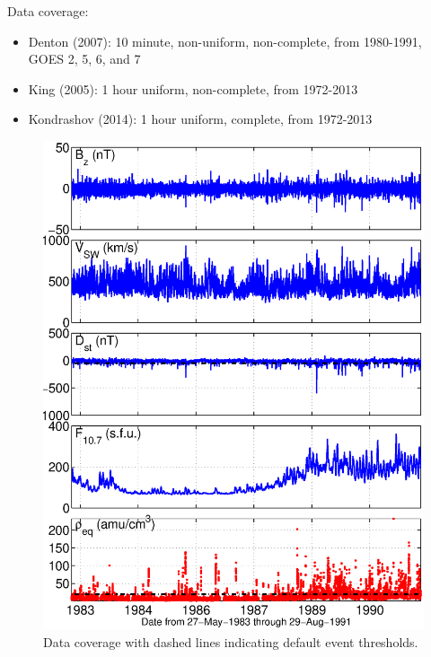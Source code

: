\documentclass[xcolor={dvipsnames,table}]{beamer}
\begin{document}
\begin{frame}
	Data coverage:
	\begin{itemize}
		\item Denton (2007): 10 minute, non-uniform, non-complete, from 1980-1991, GOES 2, 5, 6, and 7
		\item King (2005): 1 hour uniform, non-complete, from 1972-2013
		\item Kondrashov (2014): 1 hour uniform, complete, from 1972-2013
	\end{itemize}
\end{frame}


\begin{frame}
	\begin{figure}[htp!]
		\centering
		\includegraphics[width=0.5\linewidth]{Figures/alldata-GOES6-1983-1991}
		\caption{Data coverage with dashed lines indicating default event thresholds.}
		\label{fig:alldata-GOES6-1983-1991}
	\end{figure}
\end{frame}
\end{document}
